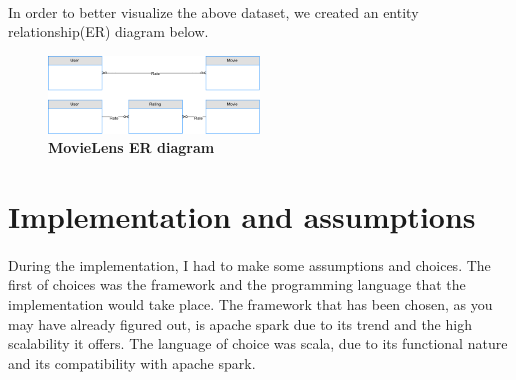 \paragraph{} In order to better visualize the above dataset, we created an entity relationship(ER) diagram below. \\
\begin{figure}[ht]
  \centering
    \includegraphics[width=0.5\textwidth]{images/MovieLensDataset.png}
    \caption{\bfseries MovieLens ER diagram \cite{MovieLens:3}}
   \label{movieLensER}
\end{figure}


\section{Implementation and assumptions}
\paragraph{}During the implementation, I had to make some assumptions and choices. The first of choices was the framework and the programming language that the implementation would take place. The framework that has been chosen, as you may have already figured out, is apache spark due to its trend and the high scalability it offers. The language of choice was scala, due to its functional nature and its compatibility with apache spark.

